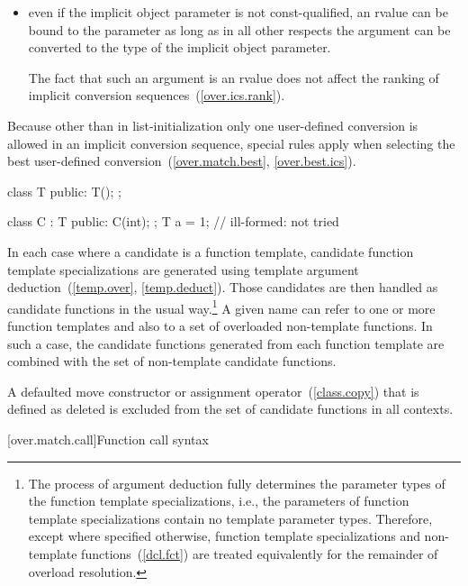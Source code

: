 \begin{itemize}
\item
even if the implicit object parameter is not
const-qualified,
an rvalue can be bound to the parameter
as long as in all other respects the argument can be
converted to the type of the implicit object parameter.
\begin{note} The fact that such an argument is an rvalue does not
affect the ranking of implicit conversion sequences~(\ref{over.ics.rank}).
\end{note}
\end{itemize}

\pnum
Because other than in list-initialization only one user-defined conversion
is allowed
in an
implicit conversion sequence, special rules apply when selecting
the best user-defined conversion~(\ref{over.match.best},
\ref{over.best.ics}).
\begin{example}

\begin{codeblock}
class T {
public:
  T();
};

class C : T {
public:
  C(int);
};
T a = 1;            // ill-formed:  not tried
\end{codeblock}
\end{example}

\pnum
In each case where a candidate is a function template, candidate
function template specializations
are generated using template argument deduction~(\ref{temp.over},
\ref{temp.deduct}).
Those candidates are then handled as candidate
functions in the usual way.\footnote{The process of argument deduction fully
determines the parameter types of
the
function template specializations,
i.e., the parameters of
function template specializations
contain
no template parameter types.
Therefore, except where specified otherwise,
function template specializations
and non-template functions~(\ref{dcl.fct}) are treated equivalently
for the remainder of overload resolution.}
A given name can refer to one or more function templates and also
to a set of overloaded non-template functions.
In such a case, the
candidate functions generated from each function template are combined
with the set of non-template candidate functions.

\pnum
A defaulted move constructor or assignment operator~(\ref{class.copy}) that is
defined as deleted is excluded from the set of candidate functions in all
contexts.

[over.match.call]{Function call syntax}%

